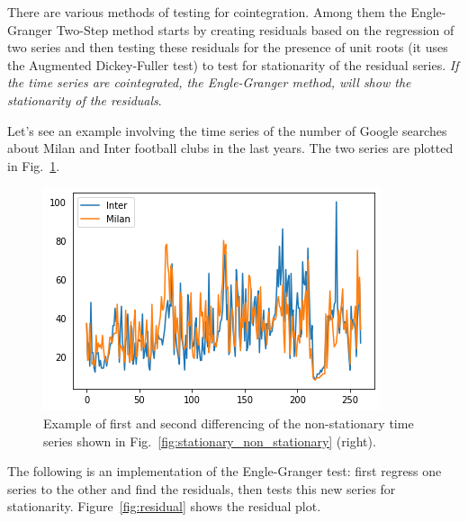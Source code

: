 There are various methods of testing for cointegration. Among them the
Engle-Granger Two-Step method starts by creating residuals based on the
regression of two series and then testing these residuals for
the presence of unit roots (it uses the Augmented Dickey-Fuller test) 
to test for stationarity of the residual series. \emph{If the time
series are cointegrated, the Engle-Granger method, will show the
stationarity of the residuals}.

Let's see an example involving the time series of the number of Google
searches about Milan and Inter football clubs in the last years.
The two series are plotted in Fig.~\ref{fig:cointegrated_series}.

\begin{figure}[htb]
	\centering
	\includegraphics[width=0.7\linewidth]{figures/cointegrated_series.png}
	\caption{Example of first and second differencing of the non-stationary time series shown in Fig.~\ref{fig:stationary_non_stationary} (right).}
	\label{fig:cointegrated_series}
\end{figure}

The following is an implementation of the Engle-Granger test: first regress
one series to the other and find the residuals, then tests this new series
for stationarity. Figure~\ref{fig:residual} shows the residual plot.
   
